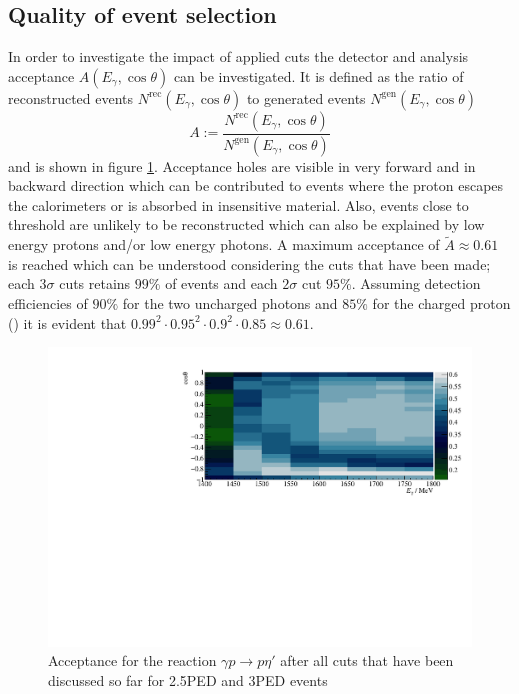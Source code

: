 \subsection{Quality of event selection}
In order to investigate the impact of applied cuts the detector and analysis acceptance $A(E_\gamma,\cos\theta)$ can be investigated. It is defined as the ratio of reconstructed events $N^\text{rec}(E_\gamma,\cos\theta)$ to generated events $N^\text{gen}(E_\gamma,\cos\theta)$ \begin{equation}
	A:=\frac{N^\text{rec}(E_\gamma,\cos\theta)}{N^\text{gen}(E_\gamma,\cos\theta)}
\end{equation}
and is shown in figure \ref{fig:acc}. Acceptance holes are visible in very forward and in backward direction which can be contributed to events where the proton escapes the calorimeters or is absorbed in insensitive material. Also, events close to threshold are unlikely to be reconstructed which can also be explained by low energy protons and/or low energy photons. A maximum acceptance of $\tilde{A}\approx0.61$ is reached which can be understood considering the cuts that have been made; each $3\sigma$ cuts retains $99\%$ of events and each $2\sigma$ cut $95\%$. Assuming detection efficiencies of $90\%$ for the two uncharged photons and $85\%$ for the charged proton (\cite{farahphd,hartmannphd}) it is evident that $0.99^2\cdot0.95^2\cdot0.9^2\cdot0.85\approx0.61$.
\begin{figure}[htbp]
	\centering
	\includegraphics[width=\linewidth]{../figs/hydrogen/acceptance.pdf}
	\caption{Acceptance for the reaction $\gamma p\to p \eta'$ after all cuts that have been discussed so far for 2.5PED and 3PED events}
	\label{fig:acc}
\end{figure}
